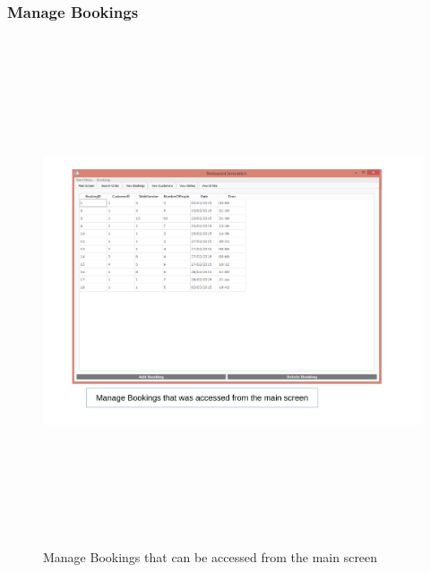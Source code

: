 \begin{landscape}
\subsubsection{Manage Bookings}
\begin{figure}[H]
    \includegraphics[height = 15cm]{./Maintenance/images/screen2}
    \caption{Manage Bookings that can be accessed from the main screen} \label{fig:screen2}
\end{figure}


\end{landscape}
